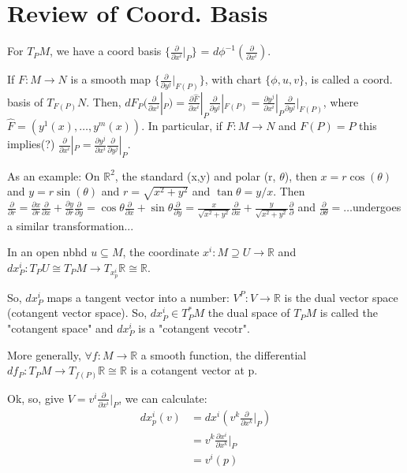 \documentclass[12pt,letterpaper]{article}
\begin{document}
\section{Review of Coord. Basis}

For $T_PM$, we have a coord basis $\{ \frac{\partial }{\partial x^i}|_P\}$ = $d\phi^{-1} (\frac{\partial }{\partial x^i})$.

If $F:M\rightarrow N$ is a smooth map $\{ \frac{\partial }{\partial y^j}|_{F(P)}\}$, with chart $\{\phi, u, v\}$, is called a coord. basis of $T_{F(P)}N$. Then, $dF_P(\frac{\partial }{\partial x^i}|_P) = \frac{\partial \hat{F}}{\partial x^i }|_P \frac{\partial }{\partial y^j}|_{F(P)}= \frac{\partial y^j}{\partial x^i}|_P \frac{\partial}{\partial y^j}|_{F(P)}$, where $\hat{F} = (y^1(x), \dots, y^m(x))$. In particular, if $F:M \rightarrow N$ and $F(P) = P$ this implies(?) $\frac{\partial}{\partial x^i}|_P = \frac{\partial y^j}{\partial x^i} \frac{\partial}{\partial y^j}|_P$.

As an example: On $\mathbb{R}^2$, the standard (x,y) and polar (r, $\theta$), then $x=r\cos(\theta)$ and $y=r\sin(\theta)$ and $r= \sqrt{x^2 + y^2}$ and $\tan\theta = y/x$. Then $\frac{\partial}{\partial r} = \frac{\partial x}{\partial r}\frac{\partial}{\partial x} + \frac{\partial y}{\partial r}\frac{\partial }{\partial y} = \cos\theta \frac{\partial }{\partial x} +  \sin\theta \frac{\partial }{\partial y}= \frac{x}{\sqrt{x^2 + y^2}}\frac{\partial}{\partial x} + \frac{y}{\sqrt{x^2 + y^2}}\frac{\partial}{\partial}$ and $\frac{\partial}{\partial \theta}= \dots$undergoes a similar transformation...

In an open nbhd $u \subseteq M$, the coordinate $x^i: M \supseteq U \rightarrow \mathbb{R} $ and $dx^i_P: T_PU \cong T_PM \rightarrow T_{x^i_p} \mathbb{R} \cong \mathbb{R}$.

So, $dx^i_P$ maps a tangent vector into a number: $V^P: V \rightarrow \mathbb{R}$ is the dual vector space (cotangent vector space). So, $dx^i_P \in T_P^*M$ the dual space of $T_PM$ is called the "cotangent space" and $dx_P^i$ is a "cotangent vecotr".

More generally, $\forall f: M\rightarrow \mathbb{R}$ a smooth function, the differential $df_P: T_PM \rightarrow T_{f(P)} \mathbb{R} \cong \mathbb{R}$ is a cotangent vector at p. 

Ok, so, give $V = v^i \frac{\partial}{\partial x^i}|_P$, we can calculate:
\begin{align*}
    dx_p^i(v) &= dx^i ( v^k \frac{\partial }{\partial x^k}|_P ) \\
    &= v^k \frac{\partial x^i}{\partial x^k}|_P \\
    &= v^i (p)
\end{align*}
\end{document}
